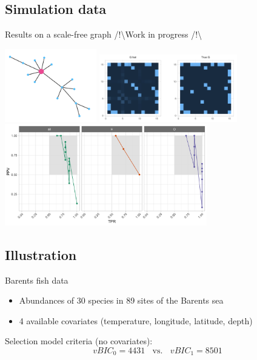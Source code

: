 \documentclass[11pt]{beamer}
\newcommand{\emphase}[1]{\textcolor{Complement}{#1}}
\begin{document}
\subsection{Simulation data}
\begin{frame}{Results on a scale-free graph \emphase{\footnotesize{/!\textbackslash Work in progress /!\textbackslash }}}
\begin{center}
\includegraphics[width=4cm]{images/SFgraph}
\pause
\includegraphics[width=6cm]{images/Ghat}\\
\pause
\includegraphics[width=8.8cm]{images/precrec_missing.png}
\end{center}
\end{frame}
\subsection{Illustration}
\begin{frame}{Barents fish data}
\begin{itemize}
\item Abundances of 30 species in 89 sites of the Barents sea
\item 4 available covariates (temperature, longitude, latitude, depth)
\end{itemize}

\bigskip\bigskip

Selection model criteria (no covariates):
$$vBIC_0 = 4431 \;\; \text{ vs. } \;\; vBIC_1 =8501$$

\end{frame}
\end{document}
